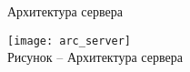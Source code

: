 \begin{center}
Архитектура сервера
\end{center}

\begin{center}
\texttt{[image: arc\_server]}\\
Рисунок -- Архитектура сервера\\
\end{center}
\vspace{\baselineskip}
